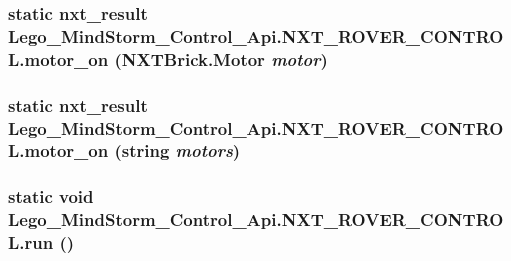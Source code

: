 \hypertarget{class_lego___mind_storm___control___api_1_1_n_x_t___r_o_v_e_r___c_o_n_t_r_o_l_7b9e1bc3c9542efb5bc3a256355a0e0c}{
\subsubsection[{motor\_\-on}]{\setlength{\rightskip}{0pt plus 5cm}static {\bf nxt\_\-result} Lego\_\-MindStorm\_\-Control\_\-Api.NXT\_\-ROVER\_\-CONTROL.motor\_\-on (NXTBrick.Motor {\em motor})}}
\label{class_lego___mind_storm___control___api_1_1_n_x_t___r_o_v_e_r___c_o_n_t_r_o_l_7b9e1bc3c9542efb5bc3a256355a0e0c}


\hypertarget{class_lego___mind_storm___control___api_1_1_n_x_t___r_o_v_e_r___c_o_n_t_r_o_l_21fcfa97e6b3394f5f5ea28ef864fed1}{
\subsubsection[{motor\_\-on}]{\setlength{\rightskip}{0pt plus 5cm}static {\bf nxt\_\-result} Lego\_\-MindStorm\_\-Control\_\-Api.NXT\_\-ROVER\_\-CONTROL.motor\_\-on (string {\em motors})}}
\label{class_lego___mind_storm___control___api_1_1_n_x_t___r_o_v_e_r___c_o_n_t_r_o_l_21fcfa97e6b3394f5f5ea28ef864fed1}


\hypertarget{class_lego___mind_storm___control___api_1_1_n_x_t___r_o_v_e_r___c_o_n_t_r_o_l_d10fd0ad39b0b68b188b846a6fe713f3}{
\subsubsection[{run}]{\setlength{\rightskip}{0pt plus 5cm}static void Lego\_\-MindStorm\_\-Control\_\-Api.NXT\_\-ROVER\_\-CONTROL.run ()}}
\label{class_lego___mind_storm___control___api_1_1_n_x_t___r_o_v_e_r___c_o_n_t_r_o_l_d10fd0ad39b0b68b188b846a6fe713f3}


